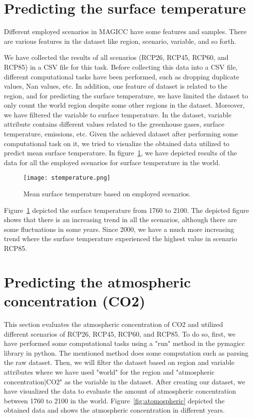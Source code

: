 \documentclass[12pt]{article}
\begin{document}
\section{Predicting the surface temperature}
\label{lab:stemp}
Different employed scenarios in MAGICC have some features and samples. There are various features in the dataset like region, scenario, variable, and so forth. 

We have collected the results of all scenarios (RCP26, RCP45, RCP60, and RCP85) in a CSV file for this task. Before collecting this data into a CSV file, different computational tasks have been performed, such as dropping duplicate values, Nan values, etc. In addition, one feature of dataset is related to the region, and for predicting the surface temperature, we have limited the dataset to only count the world region despite some other regions in the dataset. Moreover, we have filtered the variable to surface temperature. In the dataset, variable attribute contains different values related to the greenhouse gases, surface temperature, emissions, etc. Given the achieved dataset after performing some computational task on it, we tried to visualize the obtained data utilized to predict mean surface temperature. In figure~\ref{fig:stemperature}, we have depicted results of the data for all the employed scenarios for surface temperature in the world.   




\begin{figure}[H]
\centering
\texttt{[image: stemperature.png]}
\caption{Mean surface temperature based on employed scenarios.}
\label{fig:stemperature}
\end{figure}

Figure~\ref{fig:stemperature} depicted the surface temperature from 1760 to 2100. The depicted figure shows that there is an increasing trend in all the scenarios, although there are some fluctuations in some years. Since 2000, we have a much more increasing trend where the surface temperature experienced the highest value in scenario RCP85.



\section{Predicting the atmospheric concentration (CO2)}
\label{lab:stemp}

This section evaluates the atmospheric concentration of CO2 and utilized different scenarios of RCP26, RCP45, RCP60, and RCP85. To do so, first, we have performed some computational tasks using a "run" method in the pymagicc library in python. The mentioned method does some computation such as parsing the raw dataset. Then, we will filter the dataset based on region and variable attributes where we have used "world" for the region and "atmospheric concentration|CO2" as the variable in the dataset. After creating our dataset, we have visualized the data to evaluate the amount of atmospheric concentration between 1760 to 2100 in the world. Figure~\ref{fig:atomospheric} depicted the obtained data and shows the atmospheric concentration in different years.
\end{document}

